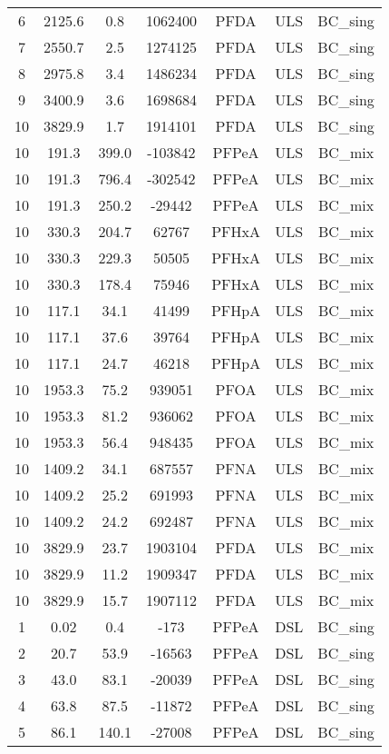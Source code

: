 \begin{longtable}[c]{ccccccc}
6 & 2125.6 & 0.8 & 1062400 & PFDA & ULS & BC\_sing \\
7 & 2550.7 & 2.5 & 1274125 & PFDA & ULS & BC\_sing \\
8 & 2975.8 & 3.4 & 1486234 & PFDA & ULS & BC\_sing \\
9 & 3400.9 & 3.6 & 1698684 & PFDA & ULS & BC\_sing \\
10 & 3829.9 & 1.7 & 1914101 & PFDA & ULS & BC\_sing \\
10 & 191.3 & 399.0 & -103842 & PFPeA & ULS & BC\_mix \\
10 & 191.3 & 796.4 & -302542 & PFPeA & ULS & BC\_mix \\
10 & 191.3 & 250.2 & -29442 & PFPeA & ULS & BC\_mix \\
10 & 330.3 & 204.7 & 62767 & PFHxA & ULS & BC\_mix \\
10 & 330.3 & 229.3 & 50505 & PFHxA & ULS & BC\_mix \\
10 & 330.3 & 178.4 & 75946 & PFHxA & ULS & BC\_mix \\
10 & 117.1 & 34.1 & 41499 & PFHpA & ULS & BC\_mix \\
10 & 117.1 & 37.6 & 39764 & PFHpA & ULS & BC\_mix \\
10 & 117.1 & 24.7 & 46218 & PFHpA & ULS & BC\_mix \\
10 & 1953.3 & 75.2 & 939051 & PFOA & ULS & BC\_mix \\
10 & 1953.3 & 81.2 & 936062 & PFOA & ULS & BC\_mix \\
10 & 1953.3 & 56.4 & 948435 & PFOA & ULS & BC\_mix \\
10 & 1409.2 & 34.1 & 687557 & PFNA & ULS & BC\_mix \\
10 & 1409.2 & 25.2 & 691993 & PFNA & ULS & BC\_mix \\
10 & 1409.2 & 24.2 & 692487 & PFNA & ULS & BC\_mix \\
10 & 3829.9 & 23.7 & 1903104 & PFDA & ULS & BC\_mix \\
10 & 3829.9 & 11.2 & 1909347 & PFDA & ULS & BC\_mix \\
10 & 3829.9 & 15.7 & 1907112 & PFDA & ULS & BC\_mix \\
1 & 0.02 & 0.4 & -173 & PFPeA & DSL & BC\_sing \\
2 & 20.7 & 53.9 & -16563 & PFPeA & DSL & BC\_sing \\
3 & 43.0 & 83.1 & -20039 & PFPeA & DSL & BC\_sing \\
4 & 63.8 & 87.5 & -11872 & PFPeA & DSL & BC\_sing \\
5 & 86.1 & 140.1 & -27008 & PFPeA & DSL & BC\_sing \\

\end{longtable}
